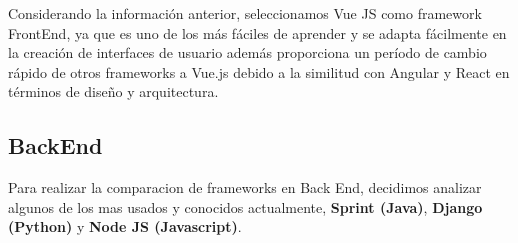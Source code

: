 \documentclass[a4paper,12 pt]{article}
\begin{document}
Considerando la información anterior, seleccionamos Vue JS como framework
FrontEnd, ya que es uno de los más fáciles de aprender y se adapta fácilmente en
la creación de interfaces de usuario además proporciona un período de cambio
rápido de otros frameworks a Vue.js debido a la similitud con Angular y React en
términos de diseño y arquitectura.

\subsection{BackEnd}

Para realizar la comparacion de frameworks en Back End, decidimos analizar
algunos de los mas usados y conocidos actualmente, \textbf{Sprint (Java)},
\textbf{Django (Python)} y \textbf{Node JS (Javascript)}.\\
\end{document}
